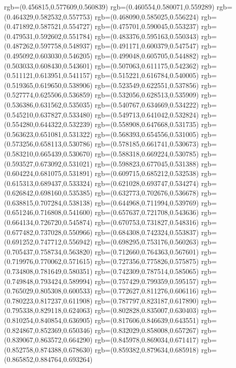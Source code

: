 {{{			rgb=(0.456815,0.577609,0.560839)
			rgb=(0.460554,0.580071,0.559289)
			rgb=(0.464329,0.582532,0.557753)
			rgb=(0.468090,0.585025,0.556224)
			rgb=(0.471892,0.587521,0.554727)
			rgb=(0.475701,0.590045,0.553237)
			rgb=(0.479531,0.592602,0.551784)
			rgb=(0.483376,0.595163,0.550343)
			rgb=(0.487262,0.597758,0.548937)
			rgb=(0.491171,0.600379,0.547547)
			rgb=(0.495092,0.603030,0.546205)
			rgb=(0.499048,0.605705,0.544882)
			rgb=(0.503033,0.608430,0.543601)
			rgb=(0.507063,0.611175,0.542362)
			rgb=(0.511121,0.613951,0.541157)
			rgb=(0.515221,0.616784,0.540005)
			rgb=(0.519365,0.619650,0.538906)
			rgb=(0.523549,0.622551,0.537856)
			rgb=(0.527774,0.625506,0.536859)
			rgb=(0.532056,0.628513,0.535909)
			rgb=(0.536386,0.631562,0.535035)
			rgb=(0.540767,0.634669,0.534222)
			rgb=(0.545210,0.637827,0.533480)
			rgb=(0.549713,0.641042,0.532824)
			rgb=(0.554280,0.644322,0.532239)
			rgb=(0.558908,0.647668,0.531735)
			rgb=(0.563623,0.651081,0.531322)
			rgb=(0.568393,0.654556,0.531005)
			rgb=(0.573256,0.658113,0.530786)
			rgb=(0.578185,0.661741,0.530673)
			rgb=(0.583210,0.665439,0.530670)
			rgb=(0.588318,0.669224,0.530785)
			rgb=(0.593527,0.673092,0.531021)
			rgb=(0.598823,0.677045,0.531388)
			rgb=(0.604224,0.681075,0.531891)
			rgb=(0.609715,0.685212,0.532538)
			rgb=(0.615313,0.689437,0.533324)
			rgb=(0.621028,0.693747,0.534274)
			rgb=(0.626842,0.698160,0.535385)
			rgb=(0.632773,0.702676,0.536678)
			rgb=(0.638815,0.707284,0.538138)
			rgb=(0.644968,0.711994,0.539769)
			rgb=(0.651246,0.716808,0.541600)
			rgb=(0.657637,0.721708,0.543636)
			rgb=(0.664134,0.726720,0.545874)
			rgb=(0.670753,0.731827,0.548316)
			rgb=(0.677482,0.737028,0.550966)
			rgb=(0.684308,0.742324,0.553837)
			rgb=(0.691252,0.747712,0.556942)
			rgb=(0.698295,0.753176,0.560263)
			rgb=(0.705437,0.758734,0.563820)
			rgb=(0.712660,0.764363,0.567601)
			rgb=(0.719976,0.770062,0.571615)
			rgb=(0.727356,0.775826,0.575875)
			rgb=(0.734808,0.781649,0.580351)
			rgb=(0.742309,0.787514,0.585065)
			rgb=(0.749848,0.793424,0.589994)
			rgb=(0.757429,0.799359,0.595157)
			rgb=(0.765029,0.805308,0.600533)
			rgb=(0.772627,0.811276,0.606116)
			rgb=(0.780223,0.817237,0.611908)
			rgb=(0.787797,0.823187,0.617890)
			rgb=(0.795338,0.829118,0.624063)
			rgb=(0.802828,0.835007,0.630403)
			rgb=(0.810254,0.840854,0.636905)
			rgb=(0.817606,0.846639,0.643551)
			rgb=(0.824867,0.852369,0.650346)
			rgb=(0.832029,0.858008,0.657267)
			rgb=(0.839067,0.863572,0.664290)
			rgb=(0.845978,0.869034,0.671417)
			rgb=(0.852758,0.874388,0.678630)
			rgb=(0.859382,0.879634,0.685918)
			rgb=(0.865852,0.884764,0.693264)
}}}
